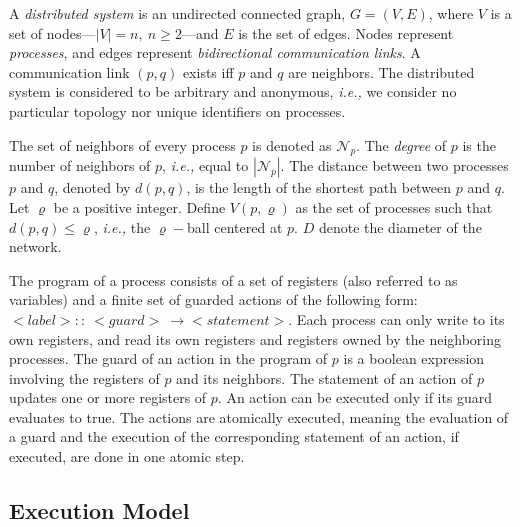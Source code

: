 \documentclass[11pt]{article}
\newcommand{\mN}   {\mathcal{N}}
\newcommand{\ie}{\emph{i.e., }}
\begin{document}
A \emph{distributed system} is an undirected connected graph, $G=(V,E)$,
where $V$ is a set of nodes---$|V|=n,\ n \geq 2$---and $E$ is the set of edges. Nodes
represent \emph{processes}, and edges represent \emph{bidirectional
communication links}. A communication link $(p,q)$ exists iff $p$ and
$q$ are neighbors.
The distributed system is considered to be arbitrary and anonymous, \ie we consider no particular topology 
nor unique identifiers on processes.

The set of neighbors of every process $p$ is denoted as $\mN_p$.
The \emph{degree} of $p$ is the number of neighbors of $p$, \ie equal to $|\mN_p|$.
The distance between two processes $p$ and $q$, denoted by $d\left( p,q\right) $,
is the length of the shortest path between $p$ and $q$.  Let $\varrho$ be a positive integer. Define $V(p,\varrho)$ 
as the set of processes such that $d(p,q) \leq \varrho$, \ie the $\varrho-$ball centered at $p$. 
$D$ denote the diameter of the network.

The program of a process consists of a set of registers (also referred to as variables) 
and a finite set of guarded actions of the following form: 
$<label>::\ <guard>\ \longrightarrow <statement>$.
Each process can only write to 
its own registers, and read its own registers and registers owned by the neighboring processes.
The guard of an action in the program of $p$ is a boolean
expression involving the registers of $p$ and its neighbors. The
statement of an action of $p$ updates one or more registers of $p$. 
An action can be executed only if its guard evaluates to true.   
The actions are atomically executed, meaning the evaluation of a guard and the execution of
the corresponding statement of an action, if executed, are done in one atomic step.

\subsection{Execution Model}
\end{document}
